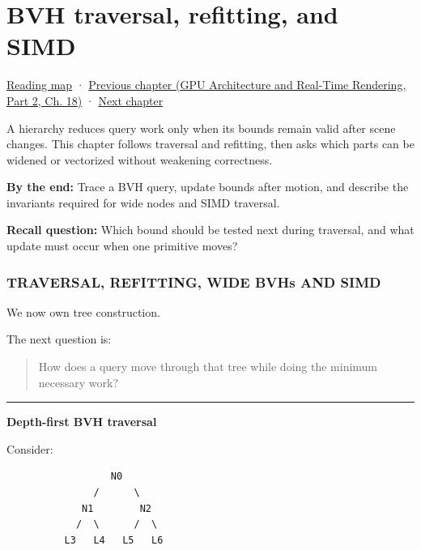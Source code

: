 \chapter{BVH traversal, refitting, and SIMD}\label{06-engine-ii-ch028-bvh-traversal-refitting-and-simd}\hypertarget{06-engine-ii-ch028}{}\label{stagechapter:06-engine-ii-ch028}

\hypertarget{06-engine-ii-ch028-bvh-traversal-refitting-and-simd}{}

\hyperref[volume-reading-map]{Reading map} · \href{../06-GPU-Architecture-and-Real-Time-Rendering-P02/main.pdf\#nameddest=06-engine-ii-ch027-preparing-and-publishing-runtime-content}{Previous chapter (GPU Architecture and Real-Time Rendering, Part 2, Ch. 18)} · \hyperref[06-engine-ii-ch029-dynamic-spatial-indices-for-moving-worlds]{Next chapter}

A hierarchy reduces query work only when its bounds remain valid after scene changes. This chapter follows traversal and refitting, then asks which parts can be widened or vectorized without weakening correctness.

\textbf{By the end:} Trace a BVH query, update bounds after motion, and describe the invariants required for wide nodes and SIMD traversal.

\textbf{Recall question:} Which bound should be tested next during traversal, and what update must occur when one primitive moves?

\subsection{TRAVERSAL, REFITTING, WIDE BVHs AND SIMD}\label{06-engine-ii-ch028-traversal-refitting-wide-bvhs-and-simd}

\hypertarget{06-engine-ii-ch028-traversal-refitting-wide-bvhs-and-simd}{}

We now own tree construction.

The next question is:

\begin{quote}
How does a query move through that tree while doing the minimum necessary work?
\end{quote}

\begin{center}\rule{0.5\linewidth}{0.5pt}\end{center}

\textbf{Depth-first BVH traversal}

Consider:

\begin{verbatim}
                  N0
               /      \
             N1        N2
            /  \      /  \
          L3   L4   L5   L6
\end{verbatim}

